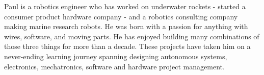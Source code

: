 

\begin{cvparagraph}

Paul is a robotics engineer who has worked on underwater rockets - started a
consumer product hardware company - and a robotics consulting company making marine
research robots. He was born with a passion for anything with wires, software,
and moving parts. He has enjoyed building many combinations of those three things
for more than a decade. These projects have taken him on a never-ending learning
journey spanning designing autonomous systems, electronics, mechatronics,
software and hardware project management.
\end{cvparagraph}
